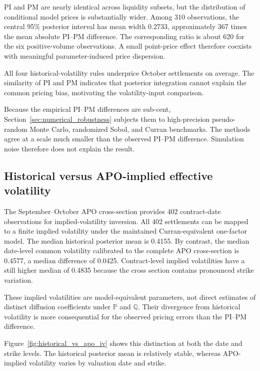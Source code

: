PI and PM are nearly identical across liquidity subsets, but the distribution of conditional model prices is substantially wider. Among 310 observations, the central 95\% posterior interval has mean width 0.2733, approximately 367 times the mean absolute PI--PM difference. The corresponding ratio is about 620 for the six positive-volume observations. A small point-price effect therefore coexists with meaningful parameter-induced price dispersion.

All four historical-volatility rules underprice October settlements on average. The similarity of PI and PM indicates that posterior integration cannot explain the common pricing bias, motivating the volatility-input comparison.

Because the empirical PI--PM differences are sub-cent, Section~\ref{sec:numerical_robustness} subjects them to high-precision pseudo-random Monte Carlo, randomized Sobol, and Curran benchmarks. The methods agree at a scale much smaller than the observed PI--PM difference. Simulation noise therefore does not explain the result.

\subsection{Historical versus APO-implied effective volatility}

The September--October APO cross-section provides 402 contract-date observations for implied-volatility inversion. All 402 settlements can be mapped to a finite implied volatility under the maintained Curran-equivalent one-factor model. The median historical posterior mean is 0.4155. By contrast, the median date-level common volatility calibrated to the complete APO cross-section is 0.4577, a median difference of 0.0425. Contract-level implied volatilities have a still higher median of 0.4835 because the cross section contains pronounced strike variation.

These implied volatilities are model-equivalent parameters, not direct estimates of distinct diffusion coefficients under $\mathbb P$ and $\mathbb Q$. Their divergence from historical volatility is more consequential for the observed pricing errors than the PI--PM difference.

Figure~\ref{fig:historical_vs_apo_iv} shows this distinction at both the date and strike levels. The historical posterior mean is relatively stable, whereas APO-implied volatility varies by valuation date and strike.

